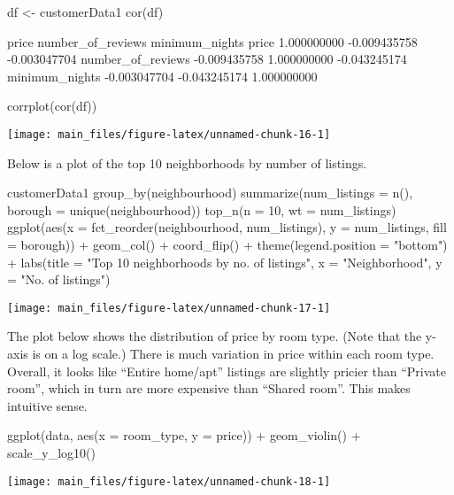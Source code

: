 \begin{Schunk}
\begin{Sinput}
df  <- customerData1  %>% select("price","number_of_reviews","minimum_nights")
cor(df)
\end{Sinput}
\begin{Soutput}
                         price number_of_reviews minimum_nights
price              1.000000000      -0.009435758   -0.003047704
number_of_reviews -0.009435758       1.000000000   -0.043245174
minimum_nights    -0.003047704      -0.043245174    1.000000000
\end{Soutput}
\begin{Sinput}
corrplot(cor(df))
\end{Sinput}


\begin{center}\texttt{[image: main\_files/figure-latex/unnamed-chunk-16-1]} \end{center}

\end{Schunk}

Below is a plot of the top 10 neighborhoods by number of listings.

\begin{Schunk}
\begin{Sinput}
customerData1 %>%
    group_by(neighbourhood) %>%
    summarize(num_listings = n(), 
              borough = unique(neighbourhood)) %>%
    top_n(n = 10, wt = num_listings) %>%
    ggplot(aes(x = fct_reorder(neighbourhood, num_listings), 
               y = num_listings, fill = borough)) +
    geom_col() +
    coord_flip() +
    theme(legend.position = "bottom") +
    labs(title = "Top 10 neighborhoods by no. of listings",
         x = "Neighborhood", y = "No. of listings")
\end{Sinput}


\begin{center}\texttt{[image: main\_files/figure-latex/unnamed-chunk-17-1]} \end{center}

\end{Schunk}

The plot below shows the distribution of price by room type. (Note that
the y-axis is on a log scale.) There is much variation in price within
each room type. Overall, it looks like ``Entire home/apt'' listings are
slightly pricier than ``Private room'', which in turn are more expensive
than ``Shared room''. This makes intuitive sense.

\begin{Schunk}
\begin{Sinput}
ggplot(data, aes(x = room_type, y = price)) +
    geom_violin() +
    scale_y_log10()
\end{Sinput}


\begin{center}\texttt{[image: main\_files/figure-latex/unnamed-chunk-18-1]} \end{center}

\end{Schunk}


